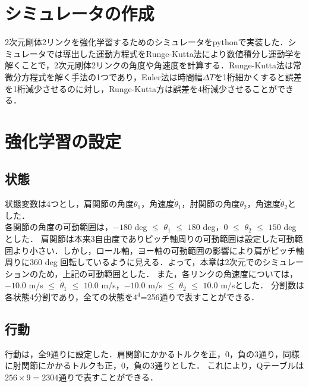 \section{シミュレータの作成}
2次元剛体2リンクを強化学習するためのシミュレータをpythonで実装した．シミュレータでは導出した運動方程式をRunge-Kutta法\cite{runge-kutta}により数値積分し運動学を解くことで，2次元剛体2リンクの角度や角速度を計算する．Runge-Kutta法は常微分方程式を解く手法の1つであり，Euler法は時間幅$\Delta T$を1桁細かくすると誤差を1桁減少させるのに対し，Runge-Kutta方は誤差を4桁減少させることができる．
\section{強化学習の設定}
\subsection{状態}
状態変数は4つとし，肩関節の角度$\theta_{1}$，角速度$\dot{\theta}_{1}$，肘関節の角度$\theta_{2}$，角速度$\dot{\theta}_{2}$とした．\\
各関節の角度の可動範囲は，$-180$ deg $\le$ $\theta_{1}$ $\le$ $180$ deg，$0$ $\le$ $\theta_{2}$ $\le$ $150$ deg\cite{range}とした．
肩関節は本来3自由度でありピッチ軸周りの可動範囲は設定した可動範囲より小さい．しかし，ロール軸，ヨー軸の可動範囲の影響により肩がピッチ軸周りに$360$ deg 回転しているように見える．よって，本章は2次元でのシミュレーションのため，上記の可動範囲とした．
また，各リンクの角速度については，$-10.0$ m/s $\le$ $\dot{\theta}_{1}$ $\le$ $10.0$ m/s，$-10.0$ m/s $\le$ $\dot{\theta}_{2}$ $\le$ $10.0$ m/sとした．
分割数は各状態4分割であり，全ての状態を$4^{4}$=256通りで表すことができる．
\subsection{行動}
行動は，全9通りに設定した．肩関節にかかるトルクを正，0，負の3通り，同様に肘関節にかかるトルクも正，0，負の3通りとした．
これにより，Qテーブルは$256 \times 9=2304$通りで表すことができる．
